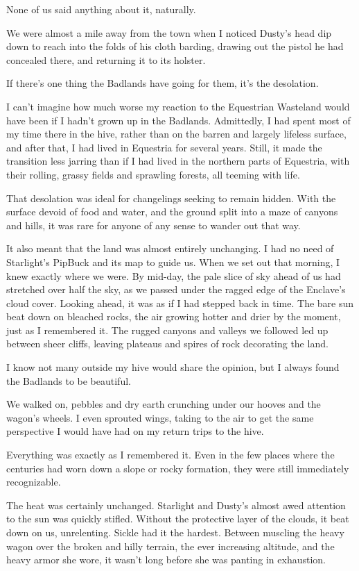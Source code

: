 None of us said anything about it, naturally.

We were almost a mile away from the town when I noticed Dusty’s head dip down to reach into the folds of his cloth barding, drawing out the pistol he had concealed there, and returning it to its holster.

{\br}%
If there’s one thing the Badlands have going for them, it’s the desolation.

I can’t imagine how much worse my reaction to the Equestrian Wasteland would have been if I hadn’t grown up in the Badlands. Admittedly, I had spent most of my time there in the hive, rather than on the barren and largely lifeless surface, and after that, I had lived in Equestria for several years. Still, it made the transition less jarring than if I had lived in the northern parts of Equestria, with their rolling, grassy fields and sprawling forests, all teeming with life.

That desolation was ideal for changelings seeking to remain hidden. With the surface devoid of food and water, and the ground split into a maze of canyons and hills, it was rare for anyone of any sense to wander out that way.

It also meant that the land was almost entirely unchanging. I had no need of Starlight’s PipBuck and its map to guide us. When we set out that morning, I knew exactly where we were. By mid-day, the pale slice of sky ahead of us had stretched over half the sky, as we passed under the ragged edge of the Enclave’s cloud cover. Looking ahead, it was as if I had stepped back in time. The bare sun beat down on bleached rocks, the air growing hotter and drier by the moment, just as I remembered it. The rugged canyons and valleys we followed led up between sheer cliffs, leaving plateaus and spires of rock decorating the land.

I know not many outside my hive would share the opinion, but I always found the Badlands to be beautiful.

We walked on, pebbles and dry earth crunching under our hooves and the wagon’s wheels. I even sprouted wings, taking to the air to get the same perspective I would have had on my return trips to the hive.

Everything was exactly as I remembered it. Even in the few places where the centuries had worn down a slope or rocky formation, they were still immediately recognizable.

The heat was certainly unchanged. Starlight and Dusty’s almost awed attention to the sun was quickly stifled. Without the protective layer of the clouds, it beat down on us, unrelenting. Sickle had it the hardest. Between muscling the heavy wagon over the broken and hilly terrain, the ever increasing altitude, and the heavy armor she wore, it wasn’t long before she was panting in exhaustion.

